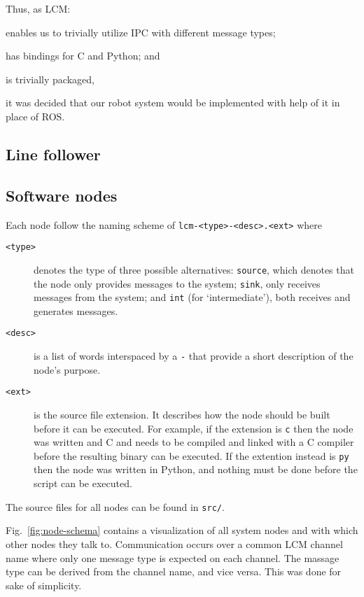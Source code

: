 Thus, as LCM:
\begin{inline-enum}
\item enables us to trivially utilize IPC with different message types;
\item has bindings for C and Python; and
\item is trivially packaged,
\end{inline-enum}
it was decided that our robot system would be implemented with help of it in place of ROS.

\subsection{Line follower}

\subsection{Software nodes}
Each node follow the naming scheme of \texttt{lcm-<type>-<desc>.<ext>} where
\begin{description}
\item[\texttt{<type>}] denotes the type of three possible alternatives:
  \texttt{source}, which denotes that the node only provides messages to the system;
  \texttt{sink}, only receives messages from the system; and
  \texttt{int} (for `intermediate'), both receives and generates messages.
\item[\texttt{<desc>}] is a list of words interspaced by a \texttt{-} that provide a short description of the node's purpose.
\item[\texttt{<ext>}] is the source file extension. It describes how the node should be built before it can be executed.
  For example, if the extension is \texttt{c} then the node was written and C and needs to be compiled and linked with a C compiler before the resulting binary can be executed.
  If the extention instead is \texttt{py} then the node was written in Python, and nothing must be done before the script can be executed.
\end{description}

The source files for all nodes can be found in \texttt{src/}.

Fig.~\ref{fig:node-schema} contains a visualization of all system nodes and with which other nodes they talk to.
Communication occurs over a common LCM channel name where only one message type is expected on each channel.
The massage type can be derived from the channel name, and vice versa.
This was done for sake of simplicity.

